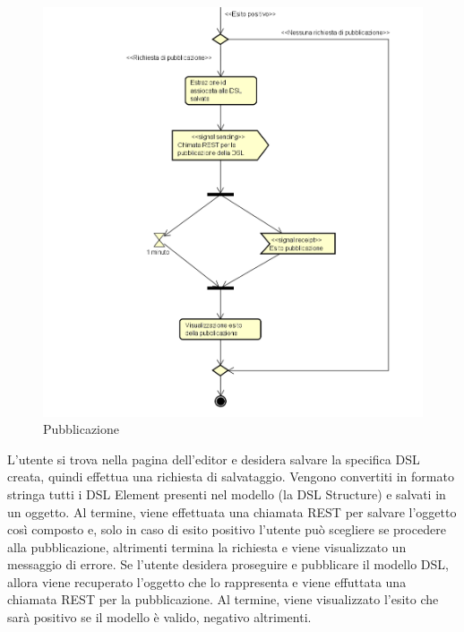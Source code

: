     \begin{figure}[H]
      \centering
      \includegraphics[width=.9\textwidth]{res/img/pubblicazione.png}
      \caption{Pubblicazione}
      \label{fig:pubblicazione}
    \end{figure}
    L'utente si trova nella pagina dell'editor e desidera salvare la specifica DSL creata, quindi effettua una richiesta di salvataggio. Vengono convertiti in formato stringa tutti i DSL Element presenti nel modello (la DSL Structure) e salvati in un oggetto. Al termine, viene effettuata una chiamata REST per salvare l'oggetto così composto e, solo in caso di esito positivo l'utente può scegliere se procedere alla pubblicazione, altrimenti termina la richiesta e viene visualizzato un messaggio di errore.
    Se l'utente desidera proseguire e pubblicare il modello DSL, allora viene recuperato l'oggetto che lo rappresenta e viene effuttata una chiamata REST per la pubblicazione. Al termine, viene visualizzato l'esito che sarà positivo se il modello è valido, negativo altrimenti.
